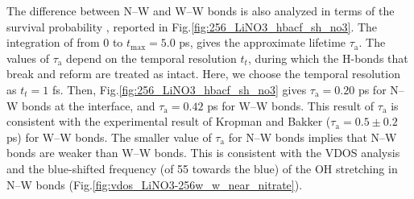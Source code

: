 %
The difference between N--W and W--W bonds 
is also analyzed in terms of the survival probability \SHB\cite{AKS86,JT90,AL96}, 
reported in Fig.\thinspace\ref {fig:256_LiNO3_hbacf_sh_no3}.
The integration of \SHB from 0 to $t_{\max}=5.0$ ps\cite{Steinel2004}, gives the approximate lifetime $\tau_\text{a}$\cite{Chowdhuri2002}. 
The values of $\tau_{\text{a}}$ depend on the temporal resolution $t_t$, during which the H-bonds that break and reform are treated as intact\cite{AL00}. 
%
Here, we choose the temporal resolution as $t_t=1$ fs. 
Then, Fig.\thinspace\ref {fig:256_LiNO3_hbacf_sh_no3} gives $\tau_\text{a}=0.20$ ps for N--W bonds at the interface, 
and $\tau_\text{a}=0.42$ ps for W--W bonds.
This result of $\tau_\text{a}$ is consistent with the experimental result of Kropman and Bakker ($\tau_\text{a}=0.5\pm0.2$ ps) for W--W bonds\cite{Kropman2001}. 
The smaller value of $\tau_\text{a}$ for N--W bonds implies that N--W bonds are weaker than W--W bonds. 
This is consistent with the VDOS analysis and the blue-shifted frequency (of 55 \cm towards the blue) of the OH stretching in N--W bonds 
(Fig.\thinspace\ref{fig:vdos_LiNO3-256w_w_near_nitrate}). 


\FloatBarrier

